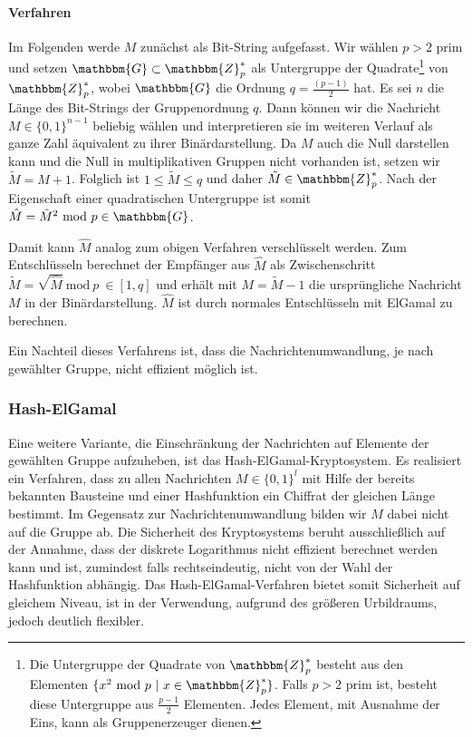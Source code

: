 \paragraph*{Verfahren} Im Folgenden werde $M$ zunächst als Bit-String
aufgefasst. Wir wählen $p > 2 $ prim und setzen $\mathbbm{G} \subset
\mathbbm{Z}^*_p$ als Untergruppe der Quadrate\footnote{Die Untergruppe
  der Quadrate von $\mathbbm{Z}^*_p$ besteht aus den Elementen $\{x^2
  \text{ mod } p\ \vert\ x \in \mathbbm{Z}^*_p\}$. Falls $p > 2$ prim ist,
  besteht diese Untergruppe aus $\frac{p - 1}{2}$ Elementen. Jedes
  Element, mit Ausnahme der Eins, kann als Gruppenerzeuger dienen.} von
$\mathbbm{Z}^*_p$, wobei $\mathbbm{G}$ die Ordnung $q = \frac{(p -
  1)}{2}$ hat.  Es sei $n$ die Länge des Bit-Strings der Gruppenordnung
$q$. Dann können wir die Nachricht $M \in \{0, 1\}^{n - 1}$ beliebig
wählen und interpretieren sie im weiteren Verlauf als ganze Zahl
äquivalent zu ihrer Binärdarstellung. Da $M$ auch die Null darstellen
kann und die Null in multiplikativen Gruppen nicht vorhanden ist, setzen
wir $\tilde{M} = M + 1$. Folglich ist $ 1 \leq \tilde{M} \leq q$ und
daher $\tilde{M} \in \mathbbm{Z}^*_p$. Nach der Eigenschaft einer
quadratischen Untergruppe ist somit $\hat{M} = \tilde{M}^2 \text{ mod }
p \in \mathbbm{G}$.

Damit kann $\hat{M}$ analog zum obigen Verfahren verschlüsselt
werden. Zum Entschlüsseln berechnet der Empfänger aus $\hat{M}$ als
Zwischenschritt $\tilde{M} = \sqrt{\hat{M}}\ \text{mod}\ p\ \in [1, q]$
und erhält mit $M = \tilde{M} - 1$ die ursprüngliche Nachricht $M$ in
der Binärdarstellung. $\hat{M}$ ist durch normales Entschlüsseln mit
ElGamal zu berechnen.

Ein Nachteil dieses Verfahrens ist, dass die Nachrichtenumwandlung, je
nach gewählter Gruppe, nicht effizient möglich ist.

\subsubsection{Hash-ElGamal} Eine weitere Variante, die Einschränkung
der Nachrichten auf Elemente der gewählten Gruppe aufzuheben, ist das
Hash-ElGamal-Kryptosystem\indexHashElGamal. Es realisiert ein Verfahren,
dass zu allen Nachrichten $M \in \{0, 1\}^l$ mit Hilfe der bereits
bekannten Bausteine und einer Hashfunktion ein Chiffrat der gleichen
Länge bestimmt. Im Gegensatz zur Nachrichtenumwandlung bilden wir $M$
dabei nicht auf die Gruppe ab. Die Sicherheit des Kryptosystems beruht
ausschließlich auf der Annahme, dass der diskrete Logarithmus nicht
effizient berechnet werden kann und ist, zumindest falls
rechtseindeutig, nicht von der Wahl der Hashfunktion abhängig. Das
Hash-ElGamal-Verfahren bietet somit Sicherheit auf gleichem Niveau, ist
in der Verwendung, aufgrund des größeren Urbildraums, jedoch deutlich
flexibler.

